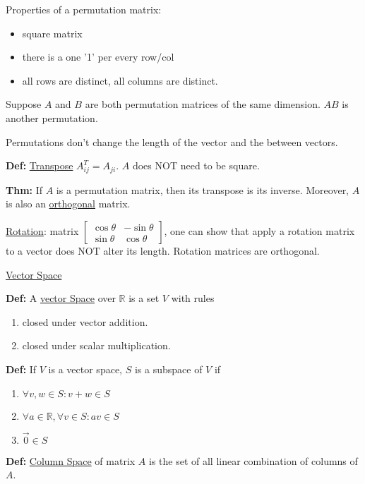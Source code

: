 \documentclass{report}
\begin{document}
Properties of a permutation matrix:
\begin{itemize}
    \item square matrix
    \item there is a one '1' per every row/col
    \item all rows are distinct, all columns are distinct.
\end{itemize}

Suppose $A$ and $B$ are both permutation matrices of the same dimension.
$AB$ is another permutation.

Permutations don't change the length of the vector and
the between vectors.

\textbf{Def:} \underline{Transpose} $A^{T}_{ij} = A_{ji}$. $A$ does NOT
need to be square.

\textbf{Thm:} If $A$ is a permutation matrix, then its
transpose is its inverse. Moreover, $A$ is also an \underline{orthogonal}
matrix.

\vspace{2mm}

\underline{Rotation}: matrix
$\begin{bmatrix}
        \cos \theta & -\sin \theta \\
        \sin \theta & \cos \theta
    \end{bmatrix}$,
one can show that apply a rotation matrix to a vector does NOT
alter its length. Rotation matrices are orthogonal.

\vspace{5mm}

\underline{Vector Space}

\textbf{Def:} A \underline{vector Space} over $\mathbb{R}$ is a set $V$
with rules
\begin{enumerate}
    \item closed under vector addition.
    \item closed under scalar multiplication.
\end{enumerate}

\textbf{Def:} If $V$ is a vector space, $S$ is a subspace of $V$ if
\begin{enumerate}
    \item $\forall v,w \in S: v + w \in S$
    \item $\forall a \in \mathbb{R}, \forall v \in S: av \in S$
    \item $\vec{0} \in S$
\end{enumerate}

\textbf{Def:} \underline{Column Space} of matrix $A$ is the set of all linear
combination of columns of $A$.
\end{document}
